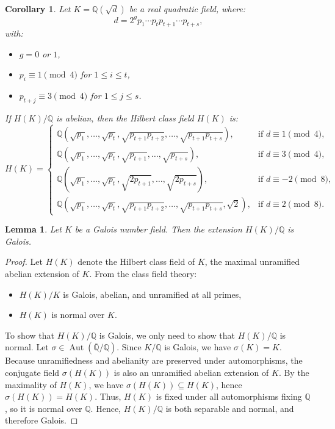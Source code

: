 \documentclass[12 pt]{amsart}
\newcommand{\Q}{\mathbb{Q}}
\newtheorem{cor}[thm]{Corollary}
\newtheorem{lemma}[thm]{Lemma}
\theoremstyle{definition}
\theoremstyle{remark}
\begin{document}
\begin{cor} \label{HK:Quadratic}
Let $K = \mathbb{Q}(\sqrt{d})$ be a real quadratic field, where:
\[
d = 2^g p_1 \cdots p_t p_{t+1} \cdots p_{t+s},
\]
with:
\begin{itemize}
\item $g = 0$ or $1$,
\item $p_i \equiv 1 \pmod{4}$ for $1 \leq i \leq t$,
\item $p_{t+j} \equiv 3 \pmod{4}$ for $1 \leq j \leq s$.
\end{itemize}
If $H(K)/\Q$ is abelian, then the Hilbert class field $H(K)$ is:
\[
H(K) = 
\begin{cases}
\mathbb{Q}\left( \sqrt{p_1}, \dots, \sqrt{p_t}, \sqrt{p_{t+1}p_{t+2}}, \dots, \sqrt{p_{t+1}p_{t+s}} \right), & \text{if } d \equiv 1 \pmod{4}, \\[0.5em]
\mathbb{Q}\left( \sqrt{p_1}, \dots, \sqrt{p_t}, \sqrt{p_{t+1}}, \dots, \sqrt{p_{t+s}} \right), & \text{if } d \equiv 3 \pmod{4}, \\[0.5em]
\mathbb{Q}\left( \sqrt{p_1}, \dots, \sqrt{p_t}, \sqrt{2p_{t+1}}, \dots, \sqrt{2p_{t+s}} \right), & \text{if } d \equiv -2 \pmod{8}, \\[0.5em]
\mathbb{Q}\left( \sqrt{p_1}, \dots, \sqrt{p_t}, \sqrt{p_{t+1}p_{t+2}}, \dots, \sqrt{p_{t+1}p_{t+s}}, \sqrt{2} \right), & \text{if } d \equiv 2 \pmod{8}.
\end{cases}
\]
\end{cor}

\begin{lemma}\label{Galiodgroup:Hilbert}
Let $K$ be a Galois number field. Then the extension $H(K)/\mathbb{Q}$ is Galois.
\end{lemma}

\begin{proof}
Let $H(K)$ denote the Hilbert class field of $K$, the maximal unramified abelian extension of $K$. From the class field theory:
\begin{itemize}
\item $H(K)/K$ is Galois, abelian, and unramified at all primes,
\item $H(K)$ is normal over $K$.
\end{itemize}
To show that $H(K)/\mathbb{Q}$ is Galois, we only need to show that $H(K)/\mathbb{Q}$ is normal.
Let $\sigma \in \operatorname{Aut}(\overline{\mathbb{Q}}/\mathbb{Q})$. Since $K/\mathbb{Q}$ is Galois, we have $\sigma(K) = K$. Because unramifiedness and abelianity are preserved under automorphisms, the conjugate field $\sigma(H(K))$ is also an unramified abelian extension of $K$. By the maximality of $H(K)$, we have $\sigma(H(K)) \subseteq H(K)$, hence  $\sigma(H(K)) = H(K)$. Thus, $H(K)$ is fixed under all automorphisms fixing $\mathbb{Q}$, so it is normal over $\mathbb{Q}$.
Hence, $H(K)/\mathbb{Q}$ is both separable and normal, and therefore Galois.
\end{proof}
\end{document}

